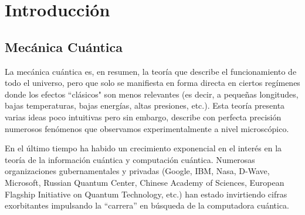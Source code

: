 \chapter{Introducción}



\section{Mecánica Cuántica}

La mecánica cuántica es, en resumen, la teoría que describe el funcionamiento de todo el universo, pero que solo se manifiesta en forma directa en ciertos regímenes donde los efectos ``clásicos" son menos relevantes (es decir, a pequeñas longitudes, bajas temperaturas, bajas energías, altas presiones, etc.). Esta teoría presenta varias ideas poco intuitivas pero sin embargo, describe con perfecta precisión numerosos fenómenos que observamos experimentalmente a nivel microscópico. 

En el último tiempo ha habido un crecimiento exponencial en el interés en la teoría de la información 
cuántica y computación cuántica. Numerosas organizaciones gubernamentales y privadas (Google, IBM, Nasa, D-Wave, Microsoft, Russian Quantum Center, Chinese Academy of Sciences, European Flagship Initiative on Quantum Technology, etc.) han estado invirtiendo cifras exorbitantes impulsando la ``carrera'' 
en búsqueda de la computadora cuántica. 

